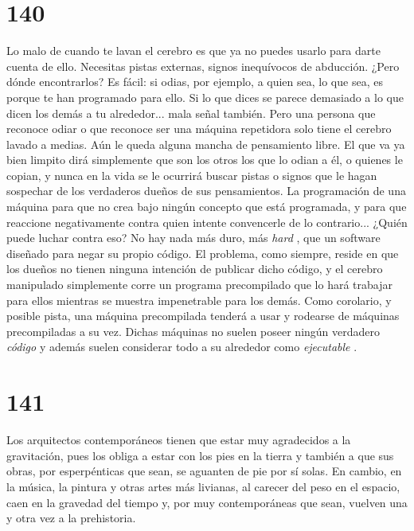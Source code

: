 \documentclass[a4paper,11pt,openright,twocolumn]{book}
\begin{document}
\section*{140}

Lo malo de cuando te lavan el cerebro es que ya no puedes usarlo para darte cuenta de ello. Necesitas pistas externas,
signos inequívocos de abducción. ¿Pero dónde encontrarlos? Es fácil: si odias, por ejemplo, a quien sea,
lo que sea, es porque te han programado para ello. Si lo que dices se parece demasiado a lo que dicen los 
demás a tu alrededor... mala señal también. Pero una persona que reconoce odiar o que reconoce ser una máquina repetidora solo tiene el cerebro
lavado a medias. Aún le queda alguna mancha de pensamiento libre. El que va ya bien limpito
dirá simplemente que son los otros los que lo odian a él, o quienes le copian, y nunca en la vida se le ocurrirá buscar
pistas o signos que le hagan sospechar de los verdaderos dueños de sus pensamientos. La programación de una máquina para que no crea bajo
ningún concepto que está programada, y para que reaccione negativamente contra quien intente convencerle
de lo contrario... ¿Quién puede luchar contra eso? No hay nada más duro, más {\it hard}  , que un software 
diseñado para negar su propio código. El problema, como siempre, reside en que los dueños no tienen ninguna intención
de publicar dicho código, y el cerebro manipulado simplemente corre un programa precompilado que lo hará trabajar
para ellos mientras se muestra impenetrable para los demás. Como corolario, y posible pista, una máquina precompilada tenderá a
usar y rodearse de máquinas precompiladas a su vez. Dichas máquinas no suelen poseer ningún verdadero {\it código}   y además suelen
considerar todo a su alrededor como {\it ejecutable}  .


\section*{141}

Los arquitectos contemporáneos tienen que estar muy agradecidos a la gravitación, pues los obliga a estar
con los pies en la tierra y también a que sus obras, por esperpénticas que sean, se aguanten de pie por sí solas.
En cambio, en la música, la pintura y otras artes más livianas, al carecer del peso en el espacio, caen en la gravedad del tiempo 
y, por muy contemporáneas que sean, vuelven una y otra vez a la prehistoria. 
\end{document}
